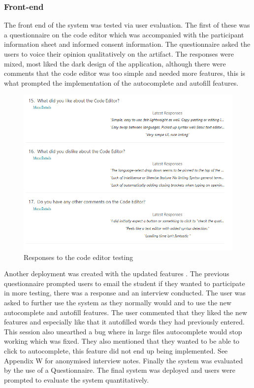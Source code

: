 \subsubsection{Front-end}
The front end of the system was tested via user evaluation.
\newline
The first of these was a questionnaire on the code editor \cite{codeeditortesting} which was accompanied with the 
participant information sheet and informed consent information. The questionnaire asked the users to voice their opinion qualitatively 
on the artifact. The responses were mixed, most liked the dark design of the application, although there were comments 
that the code editor was too simple and needed more features, this is what prompted the implementation of the autocomplete and autofill 
features.
\begin{figure}[h]
    \includegraphics[width=.5\textwidth]{images/responses-code-editor.png}
    \caption{Responses to the code editor testing}
    \label{fig:responses}
\end{figure}
\newline
Another deployment was created with the updated features \cite{codeeditortesting2}.
The previous questionnaire prompted users to email the student if they wanted to participate in more testing, there was a 
response and an interview conducted. The user was asked to further use the system as they normally would and to use the 
new autocomplete and autofill features. The user commented that they liked the new features and especially like that 
it autofilled words they had previously entered. This session also unearthed a bug where in large files autocomplete would stop working 
which was fixed. They also mentioned that they wanted to be able to click to autocomplete, this feature did not end up being implemented.
See Appendix W for anonymised interview notes.
\newline
\newline
Finally the system was evaluated by the use of a Questionnaire. The final system was deployed \cite{finalTesting} and users were prompted to evaluate the system quantitatively.
